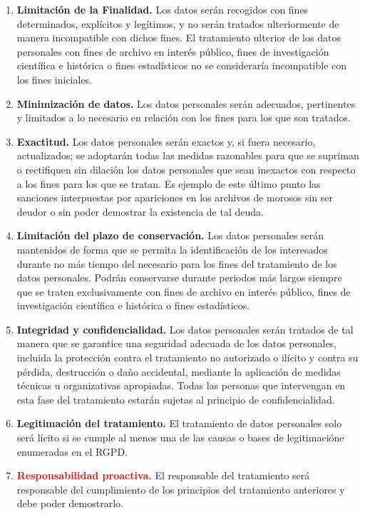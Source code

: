 \documentclass[spanish, 12pt, a4paper, twoside]{article}
\begin{document}
\begin{enumerate}
    \item \textbf{Limitación de la Finalidad.} Los datos serán recogidos con fines determinados, explícitos y legítimos, y no serán tratados ulteriormente de manera incompatible con dichos fines. El tratamiento ulterior de los datos personales con fines de archivo en interés público, fines de investigación científica e histórica o fines estadísticos no se consideraría incompatible con los fines iniciales.
    \item \textbf{Minimización de datos.} Los datos personales serán adecuados, pertinentes y limitados a lo necesario en relación con los fines para los que son tratados.
    \item \textbf{Exactitud.} Los datos personales serán exactos y, si fuera necesario, actualizados; se adoptarán todas las medidas razonables para que se supriman o rectifiquen sin dilación los datos personales que sean inexactos con respecto a los fines para los que se tratan.
    Es ejemplo de este último punto las sanciones interpuestas por apariciones en los archivos de morosos sin ser deudor o sin poder demostrar la existencia de tal deuda.
    \item \textbf{Limitación del plazo de conservación.} Los datos personales serán mantenidos de forma que se permita la identificación de los interesados durante no más tiempo del necesario para los fines del tratamiento de los datos personales. Podrán conservarse durante periodos más largos siempre que se traten exclusivamente con fines de archivo en interés público, fines de investigación científica e histórica o fines estadísticos.
    \item \textbf{Integridad y confidencialidad.} Los datos personales serán tratados de tal manera que se garantice una seguridad adecuada de los datos personales, incluida la protección contra el tratamiento no autorizado o ilícito y contra su pérdida, destrucción o daño accidental, mediante la aplicación de medidas técnicas u organizativas apropiadas. Todas las personas que intervengan en esta fase del tratamiento estarán sujetas al principio de confidencialidad.
    \item \textbf{Legitimación del tratamiento.} El tratamiento de datos personales solo será lícito si se cumple al menos una de las causas o bases de legitimacióne enumeradas en el RGPD.    
    \item \textcolor{red}{\textbf{Responsabilidad proactiva.}} El responsable del tratamiento será responsable del cumplimiento de los principios del tratamiento anteriores y debe poder demostrarlo.
\end{enumerate}
\end{document}
